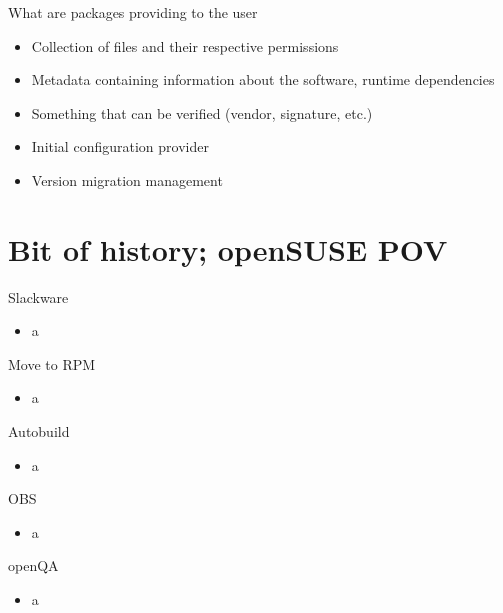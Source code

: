 \documentclass{beamer}
\begin{document}
\begin{frame}[t]{What are packages providing to the user}
	\begin{itemize}
	\item Collection of files and their respective permissions
	\item Metadata containing information about the software, runtime dependencies
	\item Something that can be verified (vendor, signature, etc.)
	\item Initial configuration provider
	\item Version migration management
	\end{itemize}
\end{frame}

\section{Bit of history; openSUSE POV}

\begin{frame}[t]{Slackware}
	\begin{itemize}
	\item a
	\end{itemize}
\end{frame}

\begin{frame}[t]{Move to RPM}
	\begin{itemize}
	\item a
	\end{itemize}
\end{frame}

\begin{frame}[t]{Autobuild}
	\begin{itemize}
	\item a
	\end{itemize}
\end{frame}

\begin{frame}[t]{OBS}
	\begin{itemize}
	\item a
	\end{itemize}
\end{frame}

\begin{frame}[t]{openQA}
	\begin{itemize}
	\item a
	\end{itemize}
\end{frame}
\end{document}
